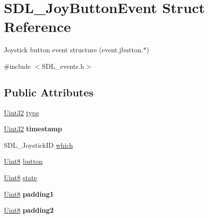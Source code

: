 \hypertarget{struct_s_d_l___joy_button_event}{}\section{S\+D\+L\+\_\+\+Joy\+Button\+Event Struct Reference}
\label{struct_s_d_l___joy_button_event}


Joystick button event structure (event.\+jbutton.$\ast$)  




{\ttfamily \#include $<$S\+D\+L\+\_\+events.\+h$>$}

\subsection*{Public Attributes}
\begin{DoxyCompactItemize}
\item 
\hyperlink{_s_d_l__stdinc_8h_add440eff171ea5f55cb00c4a9ab8672d}{Uint32} \hyperlink{struct_s_d_l___joy_button_event_a8f3312a046d37fa2884b93f69c4cb655}{type}
\item 
\mbox{\label{struct_s_d_l___joy_button_event_ab50b6f7d1ab3ac53df69fc2d6cf5fa2a}} 
\hyperlink{_s_d_l__stdinc_8h_add440eff171ea5f55cb00c4a9ab8672d}{Uint32} {\bfseries timestamp}
\item 
S\+D\+L\+\_\+\+Joystick\+ID \hyperlink{struct_s_d_l___joy_button_event_a1679049adad7242b28420948fdc79044}{which}
\item 
\hyperlink{_s_d_l__stdinc_8h_a2944638813a090aa23e62f4da842c3e2}{Uint8} \hyperlink{struct_s_d_l___joy_button_event_a73ebe4261cf80564052af9c1af737a4d}{button}
\item 
\hyperlink{_s_d_l__stdinc_8h_a2944638813a090aa23e62f4da842c3e2}{Uint8} \hyperlink{struct_s_d_l___joy_button_event_ad3b6f8d9aa2c5e694f664b97d12bcd2b}{state}
\item 
\mbox{\label{struct_s_d_l___joy_button_event_a3e7ca473fb7783d755d64598529b1ff9}} 
\hyperlink{_s_d_l__stdinc_8h_a2944638813a090aa23e62f4da842c3e2}{Uint8} {\bfseries padding1}
\item 
\mbox{\label{struct_s_d_l___joy_button_event_a77a78bee38f4bf0682ccd97bbf8f9ab9}} 
\hyperlink{_s_d_l__stdinc_8h_a2944638813a090aa23e62f4da842c3e2}{Uint8} {\bfseries padding2}
\end{DoxyCompactItemize}


